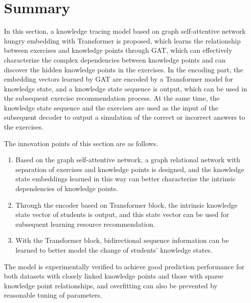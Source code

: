 \section{Summary}
%
In this section, a knowledge tracing model based on graph self-attentive network hungry embedding with Transformer is proposed, which learns the relationship between exercises and knowledge points through GAT, which can effectively characterize the complex dependencies between knowledge points and can discover the hidden knowledge points in the exercises. In the encoding part, the embedding vectors learned by GAT are encoded by a Transformer model for knowledge state, and a knowledge state sequence is output, which can be used in the subsequent exercise recommendation process. At the same time, the knowledge state sequence and the exercises are used as the input of the subsequent decoder to output a simulation of the correct or incorrect answers to the exercises.

The innovation points of this section are as follows.
\begin{enumerate}
	\item Based on the graph self-attentive network, a graph relational network with separation of exercises and knowledge points is designed, and the knowledge state embeddings learned in this way can better characterize the intrinsic dependencies of knowledge points.
	\item Through the encoder based on Transformer block, the intrinsic knowledge state vector of students is output, and this state vector can be used for subsequent learning resource recommendation.
	\item With the Transformer block, bidirectional sequence information can be learned to better model the change of students' knowledge states.
\end{enumerate}

The model is experimentally verified to achieve good prediction performance for both datasets with closely linked knowledge points and those with sparse knowledge point relationships, and overfitting can also be prevented by reasonable tuning of parameters.